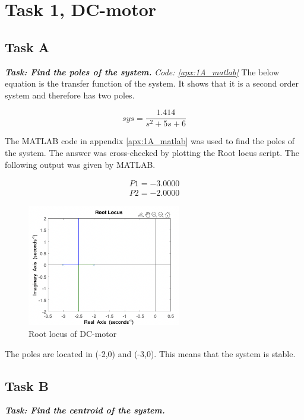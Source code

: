 \section{Task 1, DC-motor}

\subsection{Task A}
\textbf{\textit{Task: Find the poles of the system.}}
\newline
\textit{Code: \ref{apx:1A_matlab}}
The below equation is the transfer function of the system. It shows that it is a second order system and therefore has two poles. 

\begin{equation}
    sys = \frac{1.414}{s^2 + 5 s + 6}
\end{equation}

The MATLAB code in appendix \ref{apx:1A_matlab} was used to find the poles of the system. The answer was cross-checked by plotting the Root locus script. The following output was given by MATLAB.

\begin{align*}
    P1 = -3.0000 \\
    P2 = -2.0000
\end{align*}

\begin{figure}[h]
    \centering
    \includegraphics[width = 0.6\textwidth]{Images/1A_RLocus.png}
    \caption{Root locus of DC-motor}
    \label{fig:1A RLocus}
\end{figure}

The poles are located in (-2,0) and (-3,0). This means that the system is stable.

\subsection{Task B}
\textbf{\textit{Task: Find the centroid of the system.}}

